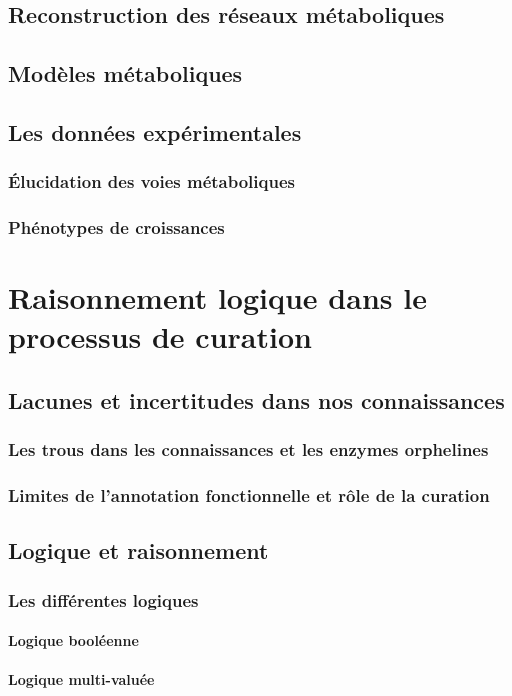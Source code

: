 \subsection{Reconstruction des réseaux métaboliques}
\subsection{Modèles métaboliques}
\subsection{Les données expérimentales}
\subsubsection{Élucidation des voies métaboliques}
\subsubsection{Phénotypes de croissances}

\section{Raisonnement logique dans le processus de curation}
\subsection{Lacunes et incertitudes dans nos connaissances}
\subsubsection{Les trous dans les connaissances et les enzymes orphelines}
\subsubsection{Limites de l’annotation fonctionnelle et rôle de la curation}
\subsection{Logique et raisonnement}
\subsubsection{Les différentes logiques}
\paragraph{Logique booléenne}
\paragraph{Logique multi-valuée}
